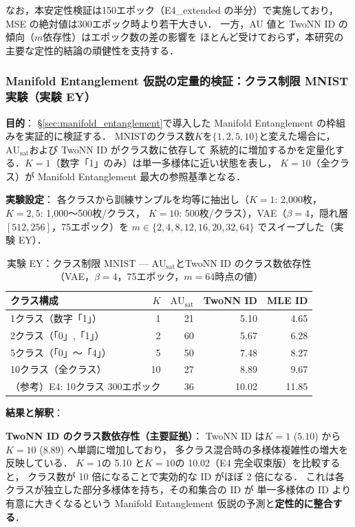 \documentclass[12pt,a4paper]{jsarticle}
\newcommand{\AUsat}{\mathrm{AU}_{\mathrm{sat}}}
\begin{document}
なお，本安定性検証は150エポック（E4\_extended の半分）で実施しており，
MSE の絶対値は300エポック時より若干大きい．
一方，AU 値と TwoNN ID の傾向（$m$依存性）はエポック数の差の影響を
ほとんど受けておらず，本研究の主要な定性的結論の頑健性を支持する．

\subsubsection{Manifold Entanglement 仮説の定量的検証：クラス制限 MNIST 実験（実験 EY）}\label{sec:exp_ey}

\textbf{目的}：
§\ref{sec:manifold_entanglement}で導入した Manifold Entanglement の枠組みを実証的に検証する．
MNISTのクラス数$K$を$\{1, 2, 5, 10\}$と変えた場合に，$\AUsat$および TwoNN ID がクラス数に依存して
系統的に増加するかを定量化する．$K = 1$（数字「1」のみ）は単一多様体に近い状態を表し，
$K = 10$（全クラス）が Manifold Entanglement 最大の参照基準となる．

\textbf{実験設定}：
各クラスから訓練サンプルを均等に抽出し（$K=1$: 2{,}000枚，$K=2,5$: 1{,}000〜500枚/クラス，
$K=10$: 500枚/クラス），VAE（$\beta = 4$，隠れ層 $[512, 256]$，75エポック）を
$m \in \{2, 4, 8, 12, 16, 20, 32, 64\}$ でスイープした（実験 EY）．

\begin{table}[H]
\centering
\caption{実験 EY：クラス制限 MNIST — $\AUsat$とTwoNN ID のクラス数依存性（VAE，$\beta=4$，75エポック，$m=64$時点の値）}
\label{tab:ey_summary}
\small
\begin{tabular}{lrrrr}
\toprule
クラス構成 & $K$ & $\AUsat$ & TwoNN ID & MLE ID \\
\midrule
1クラス（数字「1」） & 1  & 21 & 5.10 & 4.65 \\
2クラス（「0」,「1」） & 2  & 60 & 5.67 & 6.28 \\
5クラス（「0」〜「4」）& 5  & 50 & 7.48 & 8.27 \\
10クラス（全クラス）  & 10 & 27 & 8.89 & 9.67 \\
\midrule
\multicolumn{2}{l}{（参考）E4: 10クラス 300エポック} & 36 & 10.02 & 11.85 \\
\bottomrule
\end{tabular}
\end{table}

\textbf{結果と解釈}：

\textbf{TwoNN ID のクラス数依存性（主要証拠）}：
TwoNN ID は$K = 1$ ($5.10$) から$K = 10$ ($8.89$) へ単調に増加しており，
多クラス混合時の多様体複雑性の増大を反映している．
$K = 1$の 5.10 と$K = 10$の 10.02（E4 完全収束版）を比較すると，
クラス数が 10 倍になることで実効的な ID がほぼ 2 倍になる．
これは各クラスが独立した部分多様体を持ち，その和集合の ID が
単一多様体の ID より有意に大きくなるという
Manifold Entanglement 仮説の予測と\textbf{定性的に整合する}．
\end{document}
